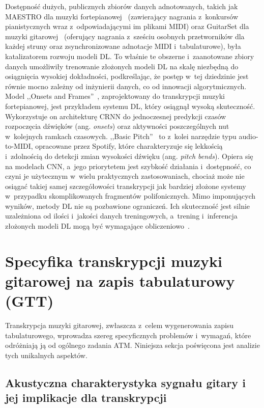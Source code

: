 Dostępność dużych, publicznych zbiorów danych adnotowanych, takich jak MAESTRO dla muzyki fortepianowej~\autocite{Hawthorne2018Onsets,Zang2023SynthTab} (zawierający nagrania z~konkursów pianistycznych wraz z~odpowiadającymi im plikami MIDI) oraz GuitarSet dla muzyki gitarowej~\autocite{Wiggins2019TabCNN,Zang2023SynthTab,Benetos2019AutomaticMusicTranscription} (oferujący nagrania z~sześciu osobnych przetworników dla każdej struny oraz zsynchronizowane adnotacje MIDI i~tabulaturowe), była katalizatorem rozwoju modeli DL. To właśnie te obszerne i~zaanotowane zbiory danych umożliwiły trenowanie złożonych modeli DL na skalę niezbędną do osiągnięcia wysokiej dokładności, podkreślając, że postęp w~tej dziedzinie jest równie mocno zależny od inżynierii danych, co od innowacji algorytmicznych. Model ,,Onsets and Frames''~\autocite{Hawthorne2018Onsets}, zaprojektowany do transkrypcji muzyki fortepianowej, jest przykładem systemu DL, który osiągnął wysoką skuteczność. Wykorzystuje on architekturę CRNN do jednoczesnej predykcji czasów rozpoczęcia dźwięków (ang. \textit{onsets}) oraz aktywności poszczególnych nut w~kolejnych ramkach czasowych. ,,Basic Pitch''~\autocite{Bittner2022BasicPitch} to z~kolei narzędzie typu audio-to-MIDI, opracowane przez Spotify, które charakteryzuje się lekkością i~zdolnością do detekcji zmian wysokości dźwięku (ang. \textit{pitch bends}). Opiera się na modelach CNN, a~jego priorytetem jest szybkość działania i~dostępność, co czyni je użytecznym w~wielu praktycznych zastosowaniach, chociaż może nie osiągać takiej samej szczegółowości transkrypcji jak bardziej złożone systemy w~przypadku skomplikowanych fragmentów polifonicznych. Mimo imponujących wyników, metody DL nie są pozbawione ograniczeń. Ich skuteczność jest silnie uzależniona od ilości i~jakości danych treningowych, a~trening i~inferencja złożonych modeli DL mogą być wymagające obliczeniowo~\autocite{Jamshidi2024SurveyAMT}.

\section{Specyfika transkrypcji muzyki gitarowej na zapis tabulaturowy (GTT)}
\label{sec:specyfika_gtt}

Transkrypcja muzyki gitarowej, zwłaszcza z~celem wygenerowania zapisu tabulaturowego, wprowadza szereg specyficznych problemów i~wymagań, które odróżniają ją od ogólnego zadania ATM. Niniejsza sekcja poświęcona jest analizie tych unikalnych aspektów.

\subsection{Akustyczna charakterystyka sygnału gitary i jej implikacje dla transkrypcji}
\label{ssec:akustyka_gitary_gtt}

